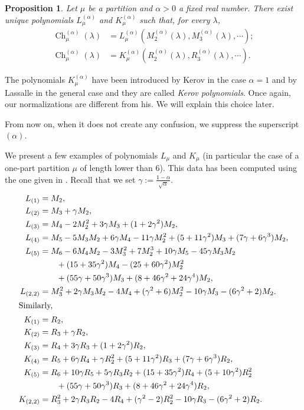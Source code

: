 \documentclass[11pt]{amsart}
\theoremstyle{plain}
\newtheorem{proposition}[lemma]{Proposition}
\theoremstyle{remark}
\DeclareMathOperator{\Ch}{Ch}
\begin{document}
\begin{proposition}
    Let $\mu$ be a partition and $\alpha >0$ a fixed real number.
    There exist unique polynomials $L_\mu^{(\alpha)}$ and $K_\mu^{(\alpha)}$
    such that, for every $\lambda$,
    \begin{align*}
        \Ch^{(\alpha)}_\mu(\lambda) &= L_\mu^{(\alpha)}\left(M_2^{(\alpha)}(\lambda),
            M_3^{(\alpha)}(\lambda),\cdots \right); \\
        \Ch^{(\alpha)}_\mu(\lambda) &= K_\mu^{(\alpha)}\left(R_2^{(\alpha)}(\lambda),
    R_3^{(\alpha)}(\lambda),\cdots \right).
\end{align*}
\end{proposition}
The polynomials $K_\mu^{(\alpha)}$ have been introduced by Kerov in the case
$\alpha=1$ \cite{Kerov2000talk,Biane2003} and by Lassalle in the general case \cite{Lassalle2009} and they are called \emph{Kerov polynomials}.
Once again, our normalizations are different from his.
We will explain this choice later.

From now on, when it does not create any confusion, we suppress the superscript
$(\alpha)$.

We present a few examples of polynomials $L_{\mu}$ and $K_{\mu}$
(in particular the case of a
one-part partition $\mu$ of length lower than $6$).
This data has been computed using the one given in \cite[page 2230]{Lassalle2009}.
Recall that we set $\gamma:=\frac{1-\alpha}{\sqrt{\alpha}}$.
\begin{align*}
    L_{(1)} &= M_2, \\
    L_{(2)} &= M_3 + \gamma M_2, \\
    L_{(3)} &= M_4 - 2M_2^2 + 3\gamma M_3 + (1 + 2\gamma^2)M_2, \\
    L_{(4)} &= M_5 - 5M_3M_2 + 6\gamma M_4 - 11\gamma M_2^2 + (5 + 11\gamma^2)M_3 + (7\gamma +
6\gamma^3)M_2, \\
L_{(5)} &= M_6 - 6M_4M_2 -3M_3^2 + 7M_2^3 + 10\gamma M_5 - 45\gamma M_3M_2 \\
&\qquad + (15+35\gamma^2)M_4 -
(25+60\gamma^2)M_2^2 \\
&\qquad+ (55\gamma + 50\gamma^3)M_3 + (8 + 46\gamma^2 + 24\gamma^4)M_2,\\
L_{(2,2)} &= M_3^2 + 2\gamma M_3 M_2 - 4 M_4 + (\gamma^2+6) M_2^2 - 10 \gamma M_3
-(6\gamma^2+2) M_2.\\
\intertext{Similarly,}
    K_{(1)} &= R_2, \\
    K_{(2)} &= R_3 + \gamma R_2, \\
    K_{(3)} &= R_4 + 3\gamma R_3 + (1 + 2\gamma^2)R_2, \\
    K_{(4)} &= R_5 + 6\gamma R_4 + \gamma R_2^2 + (5 + 11\gamma^2)R_3 + (7\gamma +
6\gamma^3)R_2, \\
K_{(5)} &= R_6 + 10\gamma R_5 + 5\gamma R_3R_2 + (15 + 35 \gamma^2) R_4 + (5+10\gamma^2) R_2^2 \\
&\qquad+ (55\gamma + 50\gamma^3)R_3 + (8 + 46\gamma^2 + 24\gamma^4)R_2,\\
K_{(2,2)} &= R_3^2 + 2\gamma R_3 R_2 - 4 R_4 + (\gamma^2-2) R_2^2 - 10 \gamma R_3
-(6\gamma^2+2) R_2.
\end{align*}
\end{document}
